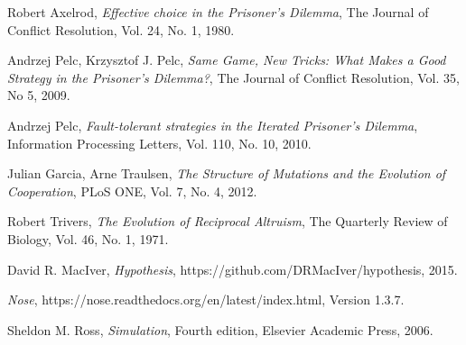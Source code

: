\documentclass[a4paper,12pt]{article}
\begin{document}
\begin{thebibliography}{9}

        Robert Axelrod,
        \emph{Effective choice in the Prisoner's Dilemma},
        The Journal of Conflict Resolution,
        Vol. 24,
        No. 1,
        1980.

        Andrzej Pelc, Krzysztof J. Pelc,
        \emph{Same Game, New Tricks: What Makes a Good Strategy in the Prisoner's Dilemma?},
        The Journal of Conflict Resolution,
        Vol. 35,
        No 5,
        2009.

        Andrzej Pelc,
        \emph{Fault-tolerant strategies in the Iterated Prisoner's Dilemma},
        Information Processing Letters,
        Vol. 110,
        No. 10,
        2010.

        Julian Garcia, Arne Traulsen,
        \emph{The Structure of Mutations and the Evolution of Cooperation},
        PLoS ONE,
        Vol. 7,
        No. 4,
        2012.

        Robert Trivers,
        \emph{The Evolution of Reciprocal Altruism},
        The Quarterly Review of Biology,
        Vol. 46,
        No. 1,
        1971.

        David R. MacIver,
        \emph{Hypothesis},
        https://github.com/DRMacIver/hypothesis,
        2015.

        \emph{Nose},
        https://nose.readthedocs.org/en/latest/index.html,
        Version 1.3.7.

        Sheldon M. Ross,
        \emph{Simulation},
        Fourth edition,
        Elsevier Academic Press,
        2006.

\end{thebibliography}
\end{document}
